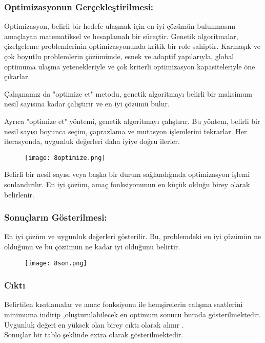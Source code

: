 \documentclass[12pt, a4paper]{article}
\begin{document}
\begin{flushleft}
\subsubsection{Optimizasyonun Gerçekleştirilmesi: }
Optimizasyon, belirli bir hedefe ulaşmak için en iyi çözümün bulunmasını amaçlayan matematiksel ve hesaplamalı bir süreçtir.
Genetik algoritmalar, çizelgeleme problemlerinin optimizasyonunda kritik bir role sahiptir. Karmaşık ve çok boyutlu problemlerin çözümünde, esnek ve adaptif yapılarıyla, global optimuma ulaşma yetenekleriyle ve çok kriterli optimizasyon kapasiteleriyle öne çıkarlar.\\[10pt]
\item Çalışmamız da "optimize et" metodu, genetik algoritmayı belirli bir maksimum nesil sayısına kadar çalıştırır ve en iyi çözümü bulur.
\item Ayrıca "optimize et" yöntemi, genetik algoritmayı çalıştırır. Bu yöntem, belirli bir nesil sayısı boyunca seçim, çaprazlama ve mutasyon işlemlerini tekrarlar. Her iterasyonda, uygunluk değerleri daha iyiye doğru ilerler.\\[10pt]
\begin{figure}[!h]
	\centering
	\texttt{[image: 8optimize.png]}
	
\end{figure}
\newpage
\item 	Belirli bir nesil sayısı veya başka bir durum sağlandığında optimizasyon işlemi sonlandırılır. En iyi çözüm, amaç fonksiyonunun en küçük olduğu birey olarak belirlenir.\\[10pt]
\newpage
\subsubsection{Sonuçların Gösterilmesi:} 
\item En iyi çözüm ve uygunluk değerleri gösterilir. Bu, problemdeki en iyi çözümün ne olduğunu ve bu çözümün ne kadar iyi olduğunu belirtir.

\begin{figure}[!h]
	\centering
	\texttt{[image: 8son.png]}
	
\end{figure}
\subsubsection{Cıktı}
\item Belirtilen kısıtlamalar  ve amac fonksiyonu ile  hemşirelerin calışma saatlerini minimuma indirip ,oluşturulabilecek en optimum sonucu burada gösterilmektedir.\\[10pt]
Uygunluk değeri en yüksek olan birey cıktı olarak alınır .\\[5pt]
Sonuçlar bir tablo şeklinde extra olarak gösterilmektedir.\\[5pt]


\end{flushleft}
\end{document}
